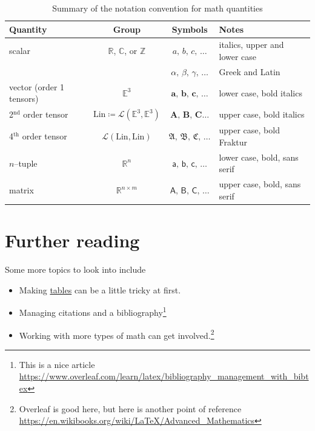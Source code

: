\documentclass[letterpaper,10pt,twoside]{article}
\providecommand\Vec{}
\renewcommand{\Vec}[1]{ \bm{#1} }
\newcommand{\Ten}[1]{ \bm{#1} }
\newcommand{\TenF}[1]{ \bm{\mathfrak{#1}} }
\newcommand{\Col}[1]{ \bm{\mathsf{#1}} }
\begin{document}
\vspace{24pt}
\begin{table}[h!]
   \centering
   \caption{Summary of the notation convention for math quantities}
   \label{tab:notation}
\begin{tabular}{lccl}
  \toprule
  \textbf{Quantity} & \textbf{Group} & \textbf{Symbols} & \textbf{Notes}\\
  \midrule
  scalar & $\mathbb{R}$, $\mathbb{C}$, or $\mathbb{Z}$ & $a,\, b,\, c,\, \ldots$ & italics, upper and lower case \\
          &                                             & $\alpha,\, \beta,\, \gamma ,\, \ldots$ & Greek and Latin \\
  \midrule
  vector (order 1 tensors) & $\mathbb{E}^3$ &  $\Vec{a},\, \Vec{b},\, \Vec{c},\, \ldots$ & lower case, bold italics \\
  2${}^\text{nd}$ order tensor & $\text{Lin}\coloneqq \mathcal{L}\left(\mathbb{E}^3,\mathbb{E}^3 \right)$ & $\Ten{A},\, \Ten{B},\, \Ten{C} \ldots$ & upper case, bold italics \\
  4${}^\text{th}$ order tensor & $\mathcal{L}\left(\text{Lin},\text{Lin}\right)$ & $\TenF{A},\, \TenF{B},\, \TenF{C},\, \ldots$ & upper case, bold Fraktur \\
  \midrule
  $n$--tuple & $\mathbb{R}^n$ & $\Col{a},\,\Col{b},\,\Col{c},\, \ldots$ & lower case, bold, sans serif \\
  matrix & $\mathbb{R}^{n\times m}$ & $\Col{A},\,\Col{B},\,\Col{C},\, \ldots$ & upper case, bold, sans serif \\
  \bottomrule
\end{tabular}
\end{table}

\section{Further reading}
Some more topics to look into include
\begin{itemize}
    
    \item Making \href{https://en.wikibooks.org/wiki/LaTeX/Tables}{tables} can be a little tricky at first.

    \item Managing citations and a bibliography\footnote{This is a nice article \url{https://www.overleaf.com/learn/latex/bibliography_management_with_bibtex}}
    
    \item Working with more types of math can get involved.\footnote{Overleaf is good here, but here is another point of reference \url{https://en.wikibooks.org/wiki/LaTeX/Advanced_Mathematics}}

\end{itemize}
\end{document}
